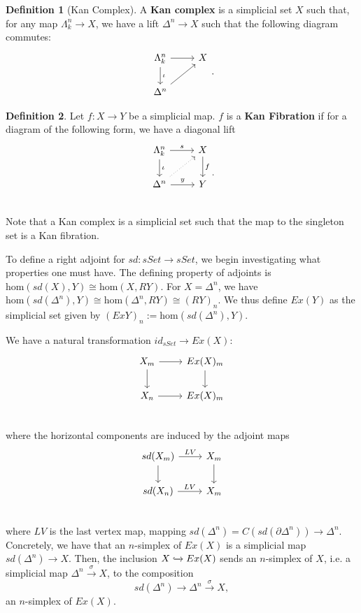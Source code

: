\documentclass{article}
\theoremstyle{definition}
\newtheorem{defn}{Definition}[section]
\begin{document}
    
    
    
    
    \begin{defn}[Kan Complex]
    A \textbf{Kan complex} is a simplicial set $X$ such that, for any map $\Lambda^{n}_{k}\rightarrow X$, we have a lift $\Delta^{n}\rightarrow X$ such that the following diagram commutes:
    \[
    \begin{tikzcd}
    \Lambda^{n}_{k}\arrow[d,"\iota"]\arrow[r] & X\\
    \Delta^{n}\arrow[ur]
    \end{tikzcd}.
    \]
    \end{defn}
    \begin{defn}
    Let $f:X\rightarrow Y$ be a simplicial map. $f$ is a \textbf{Kan Fibration} if for a diagram of the following form, we have a diagonal lift
     \[
    \begin{tikzcd}
    \Lambda^{n}_{k}\arrow[d,"\iota"]\arrow[r,"s"] & X\arrow[d,"f"]\\
    \Delta^{n}\arrow[ur,dotted]\arrow[r,"y"] & Y\\
    \end{tikzcd}.
    \]
 Note that a Kan complex is a simplicial set such that the map to the singleton set is a Kan fibration. 
    \end{defn}
    
    To define a right adjoint for $sd:sSet\rightarrow sSet$, we begin investigating what properties one must have. The defining property of adjoints is $\text{hom}(sd(X),Y)\cong \text{hom}(X,RY)$. For $X=\Delta^{n}$, we have $\text{hom}(sd(\Delta^{n}),Y)\cong \text{hom}(\Delta^{n},RY)\cong (RY)_{n}.$ We thus define $Ex(Y)$ as the simplicial set given by $(ExY)_{n}:=\text{hom}(sd(\Delta^{n}),Y)$.
    
We have a natural transformation $id_{sSet}\rightarrow Ex(X)$:
\[
\begin{tikzcd}
X_{m}\arrow[d]\arrow[r] & Ex(X)_{m}\arrow[d]\\
X_{n}\arrow[r] & Ex(X)_{m}\\
\end{tikzcd}
\]
where the horizontal components are induced by the adjoint maps
\[
\begin{tikzcd}
sd(X_{m})\arrow[d,]\arrow[r,"LV"] & X_{m}\arrow[d]\\
sd(X_{n})\arrow[r,"LV"] & X_{m}\\
\end{tikzcd}
\]
where $LV$ is the last vertex map, mapping $sd(\Delta^{n})=C(sd(\partial\Delta^{n}))\rightarrow\Delta^{n}.$ Concretely, we have that an $n$-simplex of $Ex(X)$ is a simplicial map $sd(\Delta^{n})\rightarrow X$. Then, the inclusion $X\xhookrightarrow{}Ex(X)$ sends an $n$-simplex of $X$, i.e. a simplicial map $\Delta^{n}\xrightarrow{\sigma} X$, to the composition
\[sd(\Delta^{n})\rightarrow\Delta^{n}\xrightarrow{\sigma}X, \] an $n$-simplex of $Ex(X).$
\end{document}
